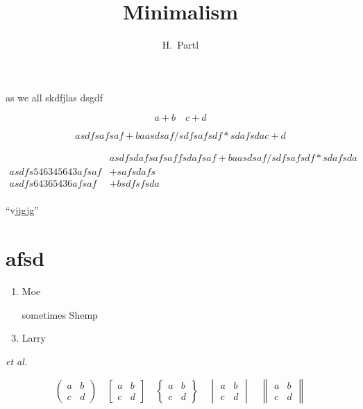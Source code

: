 \documentclass[UTF8]{article}
\author{H.~Partl}
\title{Minimalism}
\begin{document}
as we all skdfjlas
dsgdf

\begin{equation}
	a+b \quad
	c+d
\end{equation}



\begin{equation}
	asdfsafsaf +baasdsaf/sdfsafsdf*sdafsda
	c+d
\end{equation}

\begin{equation}
	\begin{aligned}
		                    & asdfsdafsafsaffsdafsaf+baasdsaf/sdfsafsdf*sdafsda \\
		asdfs546345643afsaf & +safsdafs                                         \\
		asdfs64365436afsaf  & +bsdfsfsda                                        \\
	\end{aligned}
\end{equation}



``vjjgjg''

\section{afsd}

\begin{enumerate}
	\item Moe
	\item[sometimes] Shemp
	\item Larry
\end{enumerate}

\textit{et al.}





\[
	\begin{pmatrix} a&b\\c&d \end{pmatrix} \quad
	\begin{bmatrix} a&b\\c&d \end{bmatrix} \quad
	\begin{Bmatrix} a&b\\c&d \end{Bmatrix} \quad
	\begin{vmatrix} a&b\\c&d \end{vmatrix} \quad
	\begin{Vmatrix} a&b\\c&d \end{Vmatrix}
\]
\end{document}
